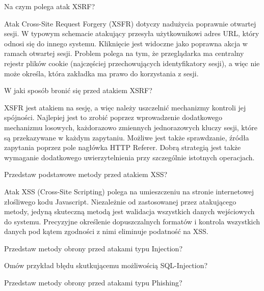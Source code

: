 \documentclass[answers,11pt]{exam}
\begin{document}
\begin{questions}
\question Na czym polega atak XSRF?
\begin{solution}
Atak Cross-Site Request Forgery (XSFR) dotyczy nadużycia poprawnie otwartej sesji. W typowym schemacie atakujący przesyła użytkownikowi adres URL, który odnosi się do innego systemu. Kliknięcie jest widoczne jako poprawna akcja w ramach otwartej sesji. Problem polega na tym, że przeglądarka ma centralny rejestr plików cookie (najczęściej przechowujących identyfikatory sesji), a więc nie może określa, która zakładka ma prawo do korzystania z sesji. 
\end{solution}

\question W jaki sposób bronić się przed atakiem XSRF?
\begin{solution}
XSFR jest atakiem na sesję, a więc należy uszczelnić mechanizmy kontroli jej spójności. Najlepiej jest to zrobić poprzez wprowadzenie dodatkowego mechanizmu losowych, każdorazowo zmiennych jednorazowych kluczy sesji, które są przekazywane w każdym zapytaniu. Możliwe jest także sprawdzanie, źródła zapytania poprzez pole nagłówka HTTP Referer. Dobrą strategią jest także wymaganie dodatkowego uwierzytelnienia przy szczególnie istotnych operacjach. 
\end{solution}


\question Przedstaw podstawowe metody przed atakiem XSS?
\begin{solution}
Atak XSS (Cross-Site Scripting) polega na umieszczeniu na stronie internetowej złośliwego kodu Javascript. Niezależnie od zastosowanej przez atakującego metody, jedyną skuteczną metodą jest walidacja wszystkich danych wejściowych do systemu. Precyzyjne określenie dopuszczalnych formatów i kontrola wszystkich danych pod kątem zgodności z nimi eliminuje podatność na XSS.  
\end{solution}

\question Przedstaw metody obrony przed atakami typu Injection?

\question Omów przykład błędu skutkującemu możliwością SQL-Injection?

\question Przedstaw metody obrony przed atakami typu Phishing?


\end{questions}
\end{document}
